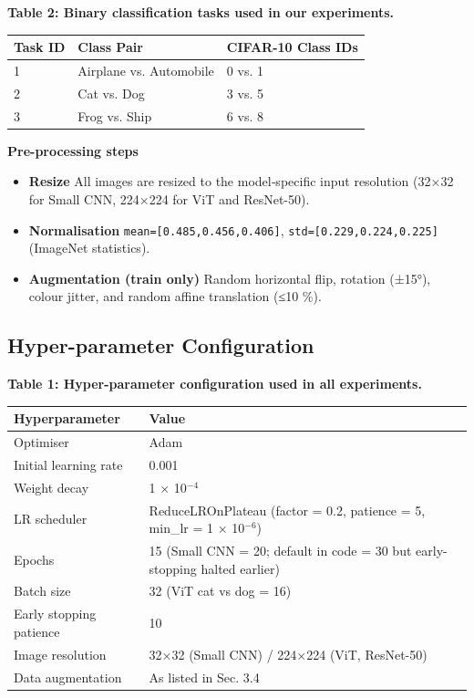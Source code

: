 \documentclass[11pt]{article}
\begin{document}
\textbf{Table 2: Binary classification tasks used in our experiments.}

\begin{tabular}{lll}
\hline
Task ID & Class Pair & CIFAR-10 Class IDs \\
\hline
1 & Airplane vs. Automobile & 0 vs. 1 \\
2 & Cat vs. Dog & 3 vs. 5 \\
3 & Frog vs. Ship & 6 vs. 8 \\
\hline
\end{tabular}

\textbf{Pre-processing steps}
\begin{itemize}
\item \textbf{Resize} All images are resized to the model‐specific input resolution (32×32 for Small CNN, 224×224 for ViT and ResNet-50).
\item \textbf{Normalisation} \texttt{mean=[0.485,0.456,0.406]}, \texttt{std=[0.229,0.224,0.225]} (ImageNet statistics).
\item \textbf{Augmentation (train only)} Random horizontal flip, rotation (±15°), colour jitter, and random affine translation (≤10 \%).
\end{itemize}

\subsection{Hyper-parameter Configuration}
\textbf{Table 1: Hyper-parameter configuration used in all experiments.}

\begin{tabular}{ll}
\hline
Hyperparameter & Value \\
\hline
Optimiser & Adam \\
Initial learning rate & 0.001 \\
Weight decay & 1 × 10$^{-4}$ \\
LR scheduler & ReduceLROnPlateau (factor = 0.2, patience = 5, min\_lr = 1 × 10$^{-6}$) \\
Epochs & 15 (Small CNN = 20; default in code = 30 but early-stopping halted earlier) \\
Batch size & 32 (ViT cat vs dog = 16) \\
Early stopping patience & 10 \\
Image resolution & 32×32 (Small CNN) / 224×224 (ViT, ResNet-50) \\
Data augmentation & As listed in Sec. 3.4 \\
\hline
\end{tabular}
\end{document}
